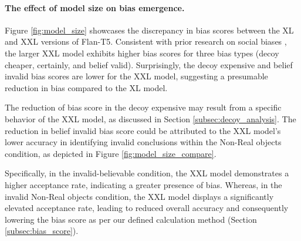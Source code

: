 \paragraph{The effect of model size on bias emergence.}

Figure \ref{fig:model_size} showcases the discrepancy in bias scores between the XL and XXL versions of  Flan-T5.
Consistent with prior research on social biases \cite{tal-etal-2022-fewer}, the larger XXL model exhibits higher bias scores for three bias types (decoy cheaper, certainly, and belief valid).
Surprisingly, the decoy expensive and belief invalid bias scores are lower for the XXL model, suggesting a presumable reduction in bias compared to the XL model.


The reduction of bias score in the decoy expensive may result from a specific behavior of the XXL model, as discussed in Section \ref{subsec:decoy_analysis}.
The reduction in belief invalid bias score could be attributed to the XXL model's lower accuracy in identifying invalid conclusions within the Non-Real objects condition, as depicted in Figure \ref{fig:model_size_compare}.

Specifically, in the invalid-believable condition, the XXL model demonstrates a higher acceptance rate, indicating a greater presence of bias.
Whereas, in the invalid Non-Real objects condition, the XXL model displays a significantly elevated acceptance rate, leading to reduced overall accuracy and consequently lowering the bias score as per our defined calculation method (Section \ref{subsec:bias_score}).




